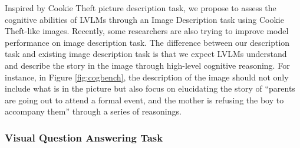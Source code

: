 Inspired by Cookie Theft picture description task, we propose to assess the cognitive abilities of LVLMs through an Image Description task using Cookie Theft-like images.
Recently, some researchers \cite{xie2022visual, zhu2023chatgpt, zhuge2023mindstorms} are also trying to improve model performance on image description task. 
The difference between our description task and existing image description task is that we expect LVLMs understand and describe the story in the image through high-level cognitive reasoning. 
For instance, in Figure \ref{fig:cogbench}, the description of the image should not only include what is in the picture but also focus on elucidating the story of ``parents are going out to attend a formal event, and the mother is refusing the boy to accompany them'' through a series of reasonings.





\subsubsection{Visual Question Answering Task}


